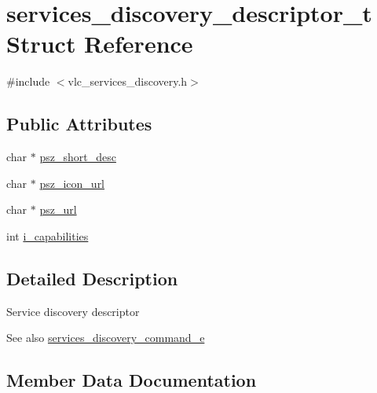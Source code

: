 \hypertarget{structservices__discovery__descriptor__t}{}\section{services\+\_\+discovery\+\_\+descriptor\+\_\+t Struct Reference}
\label{structservices__discovery__descriptor__t}


{\ttfamily \#include $<$vlc\+\_\+services\+\_\+discovery.\+h$>$}

\subsection*{Public Attributes}
\begin{DoxyCompactItemize}
\item 
char $\ast$ \hyperlink{structservices__discovery__descriptor__t_a266e2028de2fbb3be693dd08c96397fd}{psz\+\_\+short\+\_\+desc}
\item 
char $\ast$ \hyperlink{structservices__discovery__descriptor__t_ab105c98a7e197854cea1adbcc5c55eb9}{psz\+\_\+icon\+\_\+url}
\item 
char $\ast$ \hyperlink{structservices__discovery__descriptor__t_a9d1e3fe6cc01652310e46dd0a6864163}{psz\+\_\+url}
\item 
int \hyperlink{structservices__discovery__descriptor__t_a44e9b25f0495f6edd6b6ae43ad3bcab7}{i\+\_\+capabilities}
\end{DoxyCompactItemize}


\subsection{Detailed Description}
Service discovery descriptor \begin{DoxySeeAlso}{See also}
\hyperlink{vlc__services__discovery_8h_a921bb104d6f034e60446f6b67bad95e8}{services\+\_\+discovery\+\_\+command\+\_\+e} 
\end{DoxySeeAlso}


\subsection{Member Data Documentation}
\mbox{\label{structservices__discovery__descriptor__t_a44e9b25f0495f6edd6b6ae43ad3bcab7}} 
